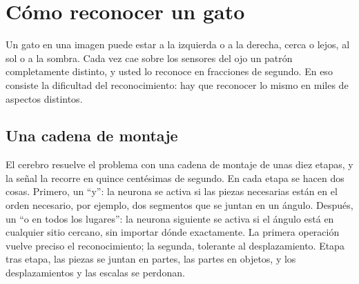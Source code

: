 \chapter{Cómo reconocer un gato}


Un gato en una imagen puede estar a la izquierda o a la derecha, cerca o lejos, al sol o a la sombra. Cada vez cae sobre los sensores del ojo un patrón completamente distinto, y usted lo reconoce en fracciones de segundo. En eso consiste la dificultad del reconocimiento: hay que reconocer lo mismo en miles de aspectos distintos.

\section*{Una cadena de montaje}

El cerebro resuelve el problema con una cadena de montaje de unas diez etapas, y la señal la recorre en quince centésimas de segundo. En cada etapa se hacen dos cosas. Primero, un “y”: la neurona se activa si las piezas necesarias están en el orden necesario, por ejemplo, dos segmentos que se juntan en un ángulo. Después, un “o en todos los lugares”: la neurona siguiente se activa si el ángulo está en cualquier sitio cercano, sin importar dónde exactamente. La primera operación vuelve preciso el reconocimiento; la segunda, tolerante al desplazamiento. Etapa tras etapa, las piezas se juntan en partes, las partes en objetos, y los desplazamientos y las escalas se perdonan.


